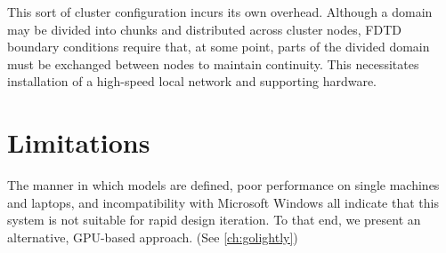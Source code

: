 This sort of cluster configuration incurs its own overhead. Although a domain may be divided into chunks and distributed across cluster nodes, FDTD boundary conditions require that, at some point, parts of the divided domain must be exchanged between nodes to maintain continuity. This necessitates installation of a high-speed local network and supporting hardware. 

\section{Limitations}

The manner in which models are defined, poor performance on single machines and laptops, and incompatibility with Microsoft Windows all indicate that this system is not suitable for rapid design iteration. To that end, we present an alternative, GPU-based approach. (See \autoref{ch:golightly})
 




